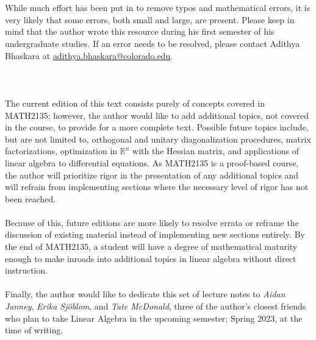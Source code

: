 \vphantom
\\
\\
While much effort has been put in to remove typos and mathematical errors, it is very likely that some errors, both small and large, are present. Please keep in mind that the author wrote this resource during his first semester of his undergraduate studies. If an error needs to be resolved, please contact Adithya Bhaskara at \href{mailto:adithya.bhaskara@colorado.edu}{adithya.bhaskara@colorado.edu}.
\\
\\
\pagebreak
\\
\\
The current edition of this text consists purely of concepts covered in MATH2135; however, the author would like to add additional topics, not covered in the course, to provide for a more complete text. Possible future topics include, but are not limited to, orthogonal and unitary diagonalization procedures, matrix factorizations, optimization in \(\mathbb{R}^n\) with the Hessian matrix, and applications of linear algebra to differential equations. As MATH2135 is a proof-based course, the author will prioritize rigor in the presentation of any additional topics and will refrain from implementing sections where the necessary level of rigor has not been reached.
\\
\\
Because of this, future editions are more likely to resolve errata or reframe the discussion of existing material instead of implementing new sections entirely. By the end of MATH2135, a student will have a degree of mathematical maturity enough to make inroads into additional topics in linear algebra without direct instruction.
\\
\\
Finally, the author would like to dedicate this set of lecture notes to \textit{Aidan Janney}, \textit{Erika Sj\"{o}blom}, and \textit{Tate McDonald}, three of the author's closest friends who plan to take Linear Algebra in the upcoming semester; Spring 2023, at the time of writing.
\\
\\
\vfill
{}